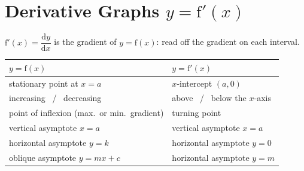 \documentclass[a4paper,11pt,oneside]{book}
\begin{document}
\section{Derivative Graphs \texorpdfstring{$y=\mathrm{f}'(x)$}{y=f'(x)}}
$\mathrm{f}'(x)=\dfrac{\mathrm{d}y}{\mathrm{d}x}$ is the gradient of $y=\mathrm{f}(x)$: read off the gradient on each interval.\par\smallskip
{\renewcommand{\arraystretch}{1.0}\centering\begin{tabular}{|l|l|}\hline
\textbf{$y=\mathrm{f}(x)$} & \textbf{$y=\mathrm{f}'(x)$}\\\hline
stationary point at $x=a$ & $x$-intercept $(a,0)$\\\hline
increasing \ / \ decreasing & above \ / \ below the $x$-axis\\\hline
point of inflexion (max.\ or min.\ gradient) & turning point\\\hline
vertical asymptote $x=a$ & vertical asymptote $x=a$\\\hline
horizontal asymptote $y=k$ & horizontal asymptote $y=0$\\\hline
oblique asymptote $y=mx+c$ & horizontal asymptote $y=m$\\\hline
\end{tabular}\par}
\end{document}
